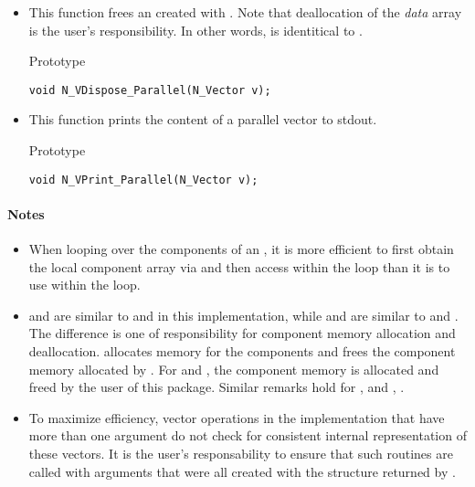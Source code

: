 \begin{itemize}
\item {}
 
  This function frees an  created with .
  Note that deallocation of the {\em data} array is the user's
  responsibility. In other words,  is identitical
  to .
 
  Prototype

  \verb|void N_VDispose_Parallel(N_Vector v);|


\item {}
  
  This function prints the content of a parallel vector to stdout.
 
  Prototype
  
  \verb|void N_VPrint_Parallel(N_Vector v);|


\end{itemize}
\paragraph{\bf Notes} 
           
\begin{itemize}
                                        
\item
  When looping over the components of an  , it is     
  more efficient to first obtain the local component array via       
   and then access  within the     
  loop than it is to use  within the loop.        
                                                               
\item
   and  are similar to  and  
   in this {\nvector} implementation, while  and 
    are      
  similar to   and . The        
  difference is one of responsibility for component memory     
  allocation and deallocation.  allocates memory  
  for the  components and  frees the     
  component memory allocated by . For    
  and , the component memory is allocated and      
  freed by the user of this package. Similar remarks hold for  
  ,   and ,              
  .                                            

\item
  To maximize efficiency, vector operations in the {\nvecp} implementation
  that have more than one  argument do not check for
  consistent internal representation of these vectors. It is the user's 
  responsability to ensure that such routines are called with 
  arguments that were all created with the  structure returned
  by .

\end{itemize}

